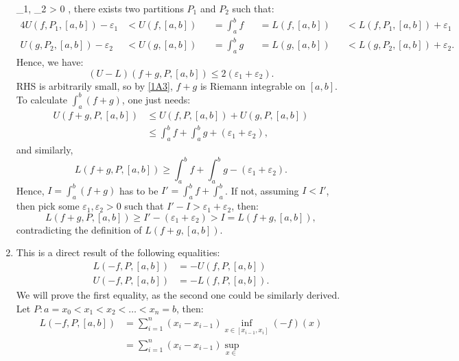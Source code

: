 \begin{enumerate}[label=\textbf{1A.\arabic*}]
    \varepsilon_{1}, \varepsilon_{2} > 0 \), there exists two partitions \(
    P_{1} \) and \( P_{2} \) such that:
    \begin{alignat*}{4}
      U(f, P_{1}, [a, b]) - \varepsilon_{1} &< U(f, [a, b]) &&= \int_{a}^{b} f 
                                            && =
      L(f, [a, b]) &&< L(f, P_{1}, [a, b]) + \varepsilon_{1}\\
      U(g, P_{2}, [a, b]) - \varepsilon_{2} &< U(g, [a, b]) &&= \int_{a}^{b} g
                                            && =
      L(g, [a, b]) &&< L(g, P_{2}, [a, b]) + \varepsilon_{2}
    .\end{alignat*}
    Hence, we have:
    \[
      (U - L)(f+g, P, [a, b]) \le 2(\varepsilon_{1}+\varepsilon_{2})
    .\] 
    RHS is arbitrarily small, so by \ref{1A3}, \( f + g \) is Riemann integrable
    on \( [a, b] \). To calculate \( \int_{a}^{b} (f+g) \), one just needs:
    \begin{align*}
      U(f+g, P, [a, b]) &\le U(f, P, [a, b]) + U(g, P, [a, b])\\
                        &\le \int_{a}^{b} f  + \int _{a}^{b} g +
                        (\varepsilon_{1} + \varepsilon_{2})
    ,\end{align*}
    and similarly,
    \[
      L(f+g, P, [a, b]) \ge \int _{a}^{b} f + \int _{a}^{b} g - (\varepsilon_{1}
      + \varepsilon_{2})
    .\] 
    Hence, \( I = \int _{a}^{b} (f + g) \) has to be \( I' = \int _{a}^{b} f + \int
    _{a}^{b} \). If not, assuming \( I < I' \), then pick some \(
    \varepsilon_{1}, \varepsilon_{2} > 0 \) such that \( I' - I >\varepsilon_{1}
    + \varepsilon_{2}\), then:
    \[
      L(f+g, P, [a, b]) \ge I' - (\varepsilon_{1}+\varepsilon_{2}) > I = L(f+g,
      [a, b])
    ,\] contradicting the definition of \( L(f+g, [a, b]) \).
  \item \label{1A5} This is a direct result of the following equalities:
    \begin{align*}
      L(-f, P, [a, b]) &=  -U(f, P, [a, b])\\
      U(-f, P, [a, b]) &= -L(f, P, [a, b])
    .\end{align*}
    We will prove the first equality, as the second one could be similarly
    derived. Let \( P: a = x_{0} < x_{1} < x_{2} < \ldots  <x_{n} = b \), then:
    \begin{align*}
      L(-f, P, [a, b]) &= \sum_{i = 1}^{n} (x_{i} - x_{i-1})\inf_{x \in
      [x_{i-1}, x_{i}]} (-f)(x)\\
                       &= \sum_{i = 1}^{n} (x_{i} - x_{i-1})\sup_{x \in
}
\end{align*}
\end{enumerate}
